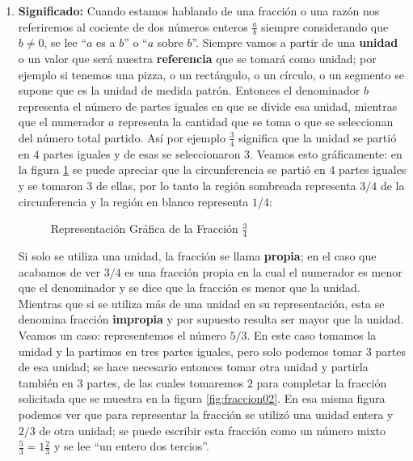 \begin{enumerate}
    \item \textbf{Significado:} Cuando estamos hablando de una fracción o una razón nos referiremos al cociente de dos números enteros $\frac{a}{b}$ siempre considerando que $b\neq 0$, se lee ``$a$ es a $b$'' o ``$a$ sobre $b$''. Siempre vamos a partir de una \textbf{unidad} o un valor que será nuestra \textbf{referencia} que se tomará como unidad; por ejemplo si tenemos una pizza, o un rectángulo, o un círculo, o un segmento se supone que es la unidad de medida patrón. Entonces el denominador $b$ representa el número de partes iguales en que se divide esa unidad, mientras que el numerador $a$ representa la cantidad que se toma o que se seleccionan del número total partido. Así por ejemplo $\frac{3}{4}$ significa que la unidad se partió en $4$ partes iguales y de esas se seleccionaron $3$. Veamos esto gráficamente: en la figura \ref{fig:fraccion01} se puede apreciar que la circunferencia se partió en $4$ partes iguales y se tomaron $3$ de ellas, por lo tanto la región sombreada representa $3/4$ de la circunferencia y la región en blanco representa $1/4$:

    \begin{figure}[ht]
    \caption{Representación Gráfica de la Fracción $\frac{3}{4}$}\label{fig:fraccion01}
    \centering
    \end{figure}

    Si solo se utiliza una unidad, la fracción se llama \textbf{propia}; en el caso que acabamos de ver $3/4$ es una fracción propia en la cual el numerador es menor que el denominador y se dice que la fracción es menor que la unidad. Mientras que si se utiliza más de una unidad en su representación, esta se denomina fracción \textbf{impropia} y por supuesto resulta ser mayor que la unidad. Veamos un caso: representemos el número $5/3$. En este caso tomamos la unidad y la partimos en tres partes iguales, pero solo podemos tomar $3$ partes de esa unidad; se hace necesario entonces tomar otra unidad y partirla también en $3$ partes, de las cuales tomaremos $2$ para completar la fracción solicitada que se muestra en la figura \ref{fig:fraccion02}. En esa misma figura podemos ver que para representar la fracción se utilizó una unidad entera y $2/3$ de otra unidad; se puede escribir esta fracción como un número mixto $\frac{5}{3}=1\frac{2}{3}$ y se lee ``un entero dos tercios''.


\end{enumerate}
